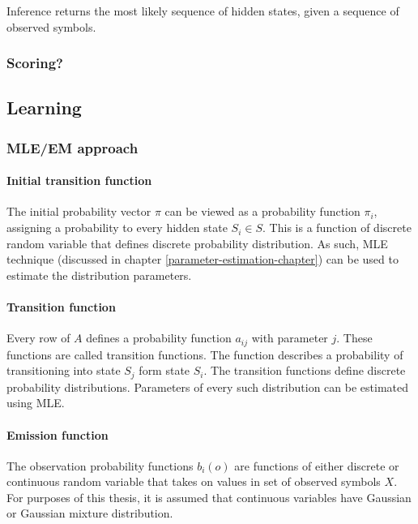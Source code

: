 \documentclass[thesis=B,english]{FITthesis}[2012/06/26]
\begin{document}
Inference returns the most likely sequence of hidden states, given a sequence of observed symbols.

\subsubsection{Scoring?}

\subsection{Learning}

\subsubsection{MLE/EM approach}

\paragraph{Initial transition function}

The initial probability vector $\pi$ can be viewed as a probability function $\pi_i$, assigning a probability to every hidden state $S_i \in S$. This is a function of discrete random variable that defines discrete probability distribution. As such, MLE technique (discussed in chapter \ref{parameter-estimation-chapter}) can be used to estimate the distribution parameters.

\paragraph{Transition function}

Every row of $A$ defines a probability function $a_{ij}$ with parameter $j$. These functions are called transition functions. The function describes a probability of transitioning into state $S_j$ form state $S_i$. The transition functions define discrete probability distributions. Parameters of every such distribution can be estimated using MLE.

\paragraph{Emission function}

The observation probability functions $b_i(o)$ are functions of either discrete or continuous random variable that takes on values in set of observed symbols $X$. For purposes of this thesis, it is assumed that continuous variables have Gaussian or Gaussian mixture distribution.
\end{document}
